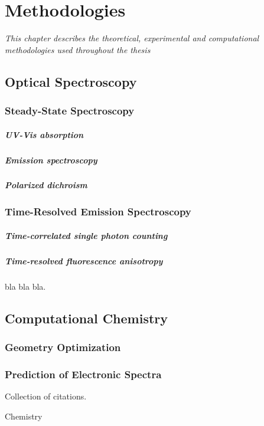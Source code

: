 \chapter{Methodologies}
\label{chap:Methodologies}
\textit{This chapter describes the theoretical, experimental and computational methodologies used throughout the thesis}
\vspace{2ex}\vfill
\minitoc
\newpage

\section{Optical Spectroscopy}
\subsection{Steady-State Spectroscopy}
\paragraph{UV-Vis absorption}
\paragraph{Emission spectroscopy}
\paragraph{Polarized dichroism}
\subsection{Time-Resolved Emission Spectroscopy}
\paragraph{Time-correlated single photon counting}
\paragraph{Time-resolved fluorescence anisotropy}
  bla bla bla.%

\section{Computational Chemistry}
\subsection{Geometry Optimization}
\subsection{Prediction of Electronic Spectra}

Collection of citations.%


Chemistry 
